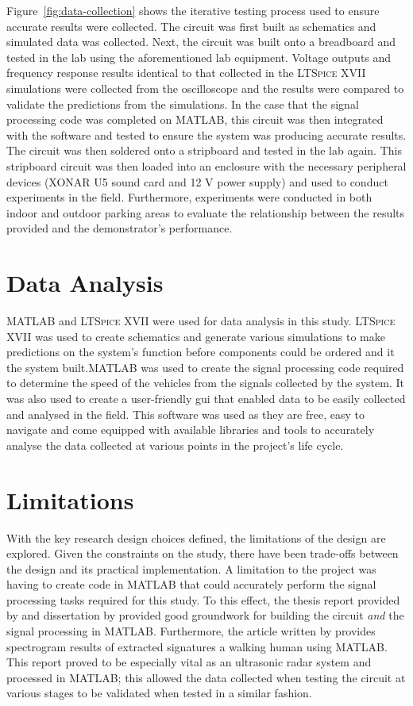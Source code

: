 \documentclass[class=report,11pt,crop=false]{standalone}
\begin{document}
Figure~\ref{fig:data-collection} shows the iterative testing process used to ensure accurate results were collected. The circuit was first built as schematics and simulated data was collected. Next, the circuit was built onto a breadboard and tested in the lab using the aforementioned lab equipment. Voltage outputs and frequency response results identical to that collected in the \textsc{LTSpice XVII} simulations were collected from the oscilloscope and the results were compared to validate the predictions from the simulations. In the case that the signal processing code was completed on \textsc{MATLAB}, this circuit was then integrated with the software and tested to ensure the system was producing accurate results. The circuit was then soldered onto a stripboard and tested in the lab again. This stripboard circuit was then loaded into an enclosure with the necessary peripheral devices (XONAR U5 sound card and 12 V power supply) and used to conduct experiments in the field. Furthermore, experiments were conducted in both indoor and outdoor parking areas to evaluate the relationship between the results provided and the demonstrator's performance.

\section{Data Analysis}
\textsc{MATLAB} and \textsc{LTSpice XVII} were used for data analysis in this study. \textsc{LTSpice XVII} was used to create schematics and generate various simulations to make predictions on the system's function before components could be ordered and it the system built.\textsc{MATLAB} was used to create the signal processing code required to determine the speed of the vehicles from the signals collected by the system. It was also used to create a user-friendly \gls{gui} that enabled data to be easily collected and analysed in the field. This software was used as they are free, easy to navigate and come equipped with available libraries and tools to accurately analyse the data collected at various points in the project's life cycle.

\section{Limitations}
With the key research design choices defined, the limitations of the design are explored. Given the constraints on the study, there have been trade-offs between the design and its practical implementation. A limitation to the project was having to create code in \textsc{MATLAB} that could accurately perform the signal processing tasks required for this study. To this effect, the thesis report provided by \cite{ian} and dissertation by \cite{clin} provided good groundwork for building the circuit \textit{and} the signal processing in \textsc{MATLAB}. Furthermore, the article written by \cite{asif} provides spectrogram results of extracted signatures a walking human using \textsc{MATLAB}. This report proved to be especially vital as an ultrasonic radar system and processed in \textsc{MATLAB}; this allowed the data collected when testing the circuit at various stages to be validated when tested in a similar fashion.
\end{document}
